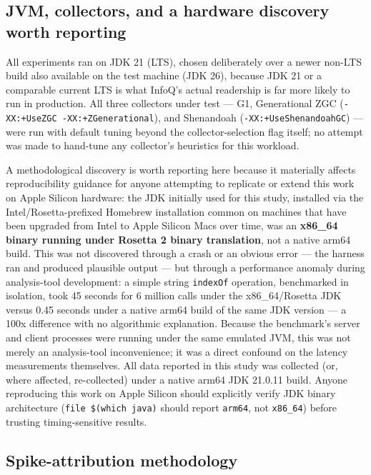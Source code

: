 \documentclass[11pt]{article}
\newcommand{\code}[1]{\texttt{#1}}
\begin{document}
\subsection{JVM, collectors, and a hardware discovery worth reporting}
\label{sec:jvm}

All experiments ran on JDK 21 (LTS), chosen deliberately over a newer non-LTS build also
available on the test machine (JDK 26), because JDK 21 or a comparable current LTS is what
InfoQ's actual readership is far more likely to run in production. All three collectors under
test --- G1, Generational ZGC (\code{-XX:+UseZGC -XX:+ZGenerational}), and Shenandoah
(\code{-XX:+UseShenandoahGC}) --- were run with default tuning beyond the collector-selection
flag itself; no attempt was made to hand-tune any collector's heuristics for this workload.

A methodological discovery is worth reporting here because it materially affects reproducibility
guidance for anyone attempting to replicate or extend this work on Apple Silicon hardware: the
JDK initially used for this study, installed via the Intel/Rosetta-prefixed Homebrew installation
common on machines that have been upgraded from Intel to Apple Silicon Macs over time, was an
\textbf{x86\_64 binary running under Rosetta 2 binary translation}, not a native arm64 build.
This was not discovered through a crash or an obvious error --- the harness ran and produced
plausible output --- but through a performance anomaly during analysis-tool development: a
simple string \code{indexOf} operation, benchmarked in isolation, took 45 seconds for 6 million
calls under the x86\_64/Rosetta JDK versus 0.45 seconds under a native arm64 build of the same
JDK version --- a 100x difference with no algorithmic explanation. Because the benchmark's server
and client processes were running under the same emulated JVM, this was not merely an
analysis-tool inconvenience; it was a direct confound on the latency measurements themselves. All
data reported in this study was collected (or, where affected, re-collected) under a native
arm64 JDK 21.0.11 build. Anyone reproducing this work on Apple Silicon should explicitly verify
JDK binary architecture (\code{file \$(which java)} should report \code{arm64}, not
\code{x86\_64}) before trusting timing-sensitive results.

\subsection{Spike-attribution methodology}
\label{sec:attribution}
\end{document}
